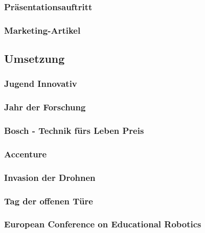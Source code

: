     \subsubsection{Präsentationsauftritt}

    \subsubsection{Marketing-Artikel}

  \subsection{Umsetzung}

    \subsubsection{Jugend Innovativ}

    \subsubsection{Jahr der Forschung}

    \subsubsection{Bosch - Technik fürs Leben Preis}

    \subsubsection{Accenture}

    \subsubsection{Invasion der Drohnen}

    \subsubsection{Tag der offenen Türe}

    \subsubsection{European Conference on Educational Robotics}
